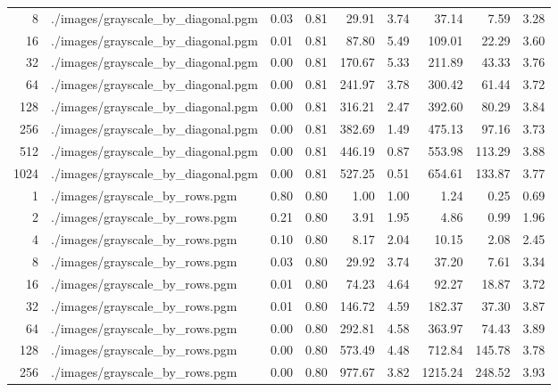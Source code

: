 \begin{table}[H]
\begin{adjustbox}{width=\textwidth, keepaspectratio}
\begin{tabular}{rlrrrrrrr}
                    8 & ./images/grayscale\_by\_diagonal.pgm & 0.03 & 0.81 & 29.91 & 3.74 & 37.14 & 7.59 & 3.28 \\
                    16 & ./images/grayscale\_by\_diagonal.pgm & 0.01 & 0.81 & 87.80 & 5.49 & 109.01 & 22.29 & 3.60 \\
                    32 & ./images/grayscale\_by\_diagonal.pgm & 0.00 & 0.81 & 170.67 & 5.33 & 211.89 & 43.33 & 3.76 \\
                    64 & ./images/grayscale\_by\_diagonal.pgm & 0.00 & 0.81 & 241.97 & 3.78 & 300.42 & 61.44 & 3.72 \\
                    128 & ./images/grayscale\_by\_diagonal.pgm & 0.00 & 0.81 & 316.21 & 2.47 & 392.60 & 80.29 & 3.84 \\
                    256 & ./images/grayscale\_by\_diagonal.pgm & 0.00 & 0.81 & 382.69 & 1.49 & 475.13 & 97.16 & 3.73 \\
                    512 & ./images/grayscale\_by\_diagonal.pgm & 0.00 & 0.81 & 446.19 & 0.87 & 553.98 & 113.29 & 3.88 \\
                    1024 & ./images/grayscale\_by\_diagonal.pgm & 0.00 & 0.81 & 527.25 & 0.51 & 654.61 & 133.87 & 3.77 \\
                    1 & ./images/grayscale\_by\_rows.pgm & 0.80 & 0.80 & 1.00 & 1.00 & 1.24 & 0.25 & 0.69 \\
                    2 & ./images/grayscale\_by\_rows.pgm & 0.21 & 0.80 & 3.91 & 1.95 & 4.86 & 0.99 & 1.96 \\
                    4 & ./images/grayscale\_by\_rows.pgm & 0.10 & 0.80 & 8.17 & 2.04 & 10.15 & 2.08 & 2.45 \\
                    8 & ./images/grayscale\_by\_rows.pgm & 0.03 & 0.80 & 29.92 & 3.74 & 37.20 & 7.61 & 3.34 \\
                    16 & ./images/grayscale\_by\_rows.pgm & 0.01 & 0.80 & 74.23 & 4.64 & 92.27 & 18.87 & 3.72 \\
                    32 & ./images/grayscale\_by\_rows.pgm & 0.01 & 0.80 & 146.72 & 4.59 & 182.37 & 37.30 & 3.87 \\
                    64 & ./images/grayscale\_by\_rows.pgm & 0.00 & 0.80 & 292.81 & 4.58 & 363.97 & 74.43 & 3.89 \\
                    128 & ./images/grayscale\_by\_rows.pgm & 0.00 & 0.80 & 573.49 & 4.48 & 712.84 & 145.78 & 3.78 \\
                    256 & ./images/grayscale\_by\_rows.pgm & 0.00 & 0.80 & 977.67 & 3.82 & 1215.24 & 248.52 & 3.93 \\

\end{tabular}
\end{adjustbox}
\end{table}
